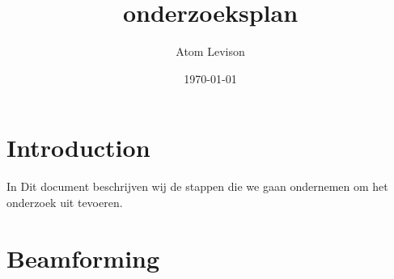 \documentclass{article}
\title{onderzoeksplan}
\author{Atom Levison}
\date{\today}
\begin{document}
\maketitle

\section{Introduction}
In Dit document beschrijven wij de stappen die we gaan ondernemen om het onderzoek uit tevoeren.
\section{Beamforming}
\end{document}
